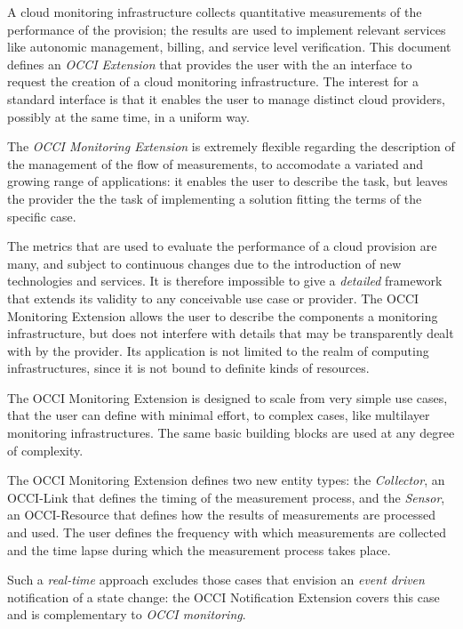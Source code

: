 \documentclass[10pt,a4paper]{article}
\begin{document}
A cloud monitoring infrastructure collects quantitative measurements of the performance of the provision; the results are used to implement relevant services like autonomic management, billing, and service level verification. This document defines an {\em OCCI Extension} that provides the user with the an interface to request the creation of a cloud monitoring infrastructure. The interest for a standard interface is that it enables the user to manage distinct cloud providers, possibly at the same time, in a uniform way.

The {\em OCCI Monitoring Extension} is extremely flexible regarding the description of the management of the flow of measurements, to accomodate a variated and growing range of applications: it enables the user to describe the task, but leaves the provider the the task of implementing a solution fitting the terms of the specific case.

The metrics that are used to evaluate the performance of a cloud provision are many, and subject to continuous changes due to the introduction of new technologies and services. It is therefore impossible to give a {\em detailed} framework that extends its validity to any conceivable use case or provider.  The OCCI Monitoring Extension allows the user to describe the components a monitoring infrastructure, but does not interfere with details that may be transparently dealt with by the provider. Its application is not limited to the realm of computing infrastructures, since it is not bound to definite kinds of resources.

The OCCI Monitoring Extension is designed to scale from very simple use cases, that the user can define with minimal effort, to complex cases, like multilayer monitoring infrastructures. The same basic building blocks are used at any degree of complexity.

The OCCI Monitoring Extension defines two new entity types: the {\em Collector}, an OCCI-Link that defines the timing of the measurement process, and the {\em Sensor}, an OCCI-Resource that defines how the results of measurements are processed and used. The user defines the frequency with which measurements are collected and the time lapse during which the measurement process takes place. 

Such a {\em real-time} approach excludes those cases that envision an {\em event driven} notification of a state change: the OCCI Notification Extension covers this case and is complementary to {\em OCCI monitoring}.
\end{document}
